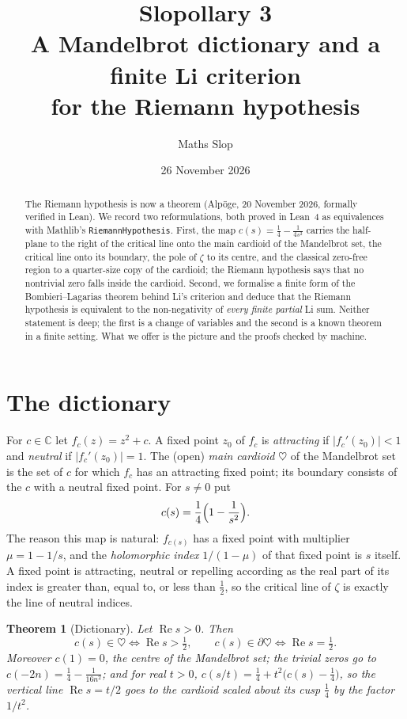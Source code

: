 \documentclass[11pt,a4paper]{article}
\title{\textbf{Slopollary 3}\\[2pt]\large A Mandelbrot dictionary and a finite Li criterion\\ for the Riemann hypothesis}
\author{Maths Slop}
\date{26 November 2026}
\newtheorem{theorem}{Theorem}
\theoremstyle{remark}\newtheorem*{remark}{Remark}
\renewcommand{\Re}{\operatorname{Re}}
\begin{document}
\maketitle

\begin{abstract}
The Riemann hypothesis is now a theorem (Alp\"oge, 20 November 2026, formally
verified in Lean). We record two reformulations, both proved in Lean~4 as
equivalences with Mathlib's \texttt{RiemannHypothesis}. First, the map
$c(s)=\tfrac14-\tfrac1{4s^{2}}$ carries the half-plane to the right of the critical
line onto the main cardioid of the Mandelbrot set, the critical line onto its
boundary, the pole of $\zeta$ to its centre, and the classical zero-free region to
a quarter-size copy of the cardioid; the Riemann hypothesis says that no
nontrivial zero falls inside the cardioid. Second, we formalise a finite form of
the Bombieri--Lagarias theorem behind Li's criterion and deduce that the Riemann
hypothesis is equivalent to the non-negativity of \emph{every finite partial} Li sum.
Neither statement is deep; the first is a change of variables and the second is a
known theorem in a finite setting. What we offer is the picture and the proofs
checked by machine.
\end{abstract}

\section{The dictionary}
For $c\in\mathbb{C}$ let $f_c(z)=z^{2}+c$. A fixed point $z_0$ of $f_c$ is
\emph{attracting} if $|f_c'(z_0)|<1$ and \emph{neutral} if $|f_c'(z_0)|=1$. The
(open) \emph{main cardioid} $\heartsuit$ of the Mandelbrot set is the set of $c$ for
which $f_c$ has an attracting fixed point; its boundary consists of the $c$ with a
neutral fixed point. For $s\neq0$ put
\[
  c(s)=\frac14\Bigl(1-\frac1{s^{2}}\Bigr).
\]
The reason this map is natural: $f_{c(s)}$ has a fixed point with multiplier
$\mu=1-1/s$, and the \emph{holomorphic index} $1/(1-\mu)$ of that fixed point is $s$
itself. A fixed point is attracting, neutral or repelling according as the real part
of its index is greater than, equal to, or less than $\tfrac12$, so the critical line
of $\zeta$ is exactly the line of neutral indices.

\begin{theorem}[Dictionary]\label{dict}
Let $\Re s>0$. Then
\[
  c(s)\in\heartsuit \iff \Re s>\tfrac12,
  \qquad
  c(s)\in\partial\heartsuit \iff \Re s=\tfrac12 .
\]
Moreover $c(1)=0$, the centre of the Mandelbrot set; the trivial zeros go to
$c(-2n)=\tfrac14-\tfrac1{16n^{2}}$; and for real $t>0$,
$c(s/t)=\tfrac14+t^{2}\bigl(c(s)-\tfrac14\bigr)$, so the vertical line
$\Re s=t/2$ goes to the cardioid scaled about its cusp $\tfrac14$ by the factor $1/t^{2}$.
\end{theorem}
\end{document}
